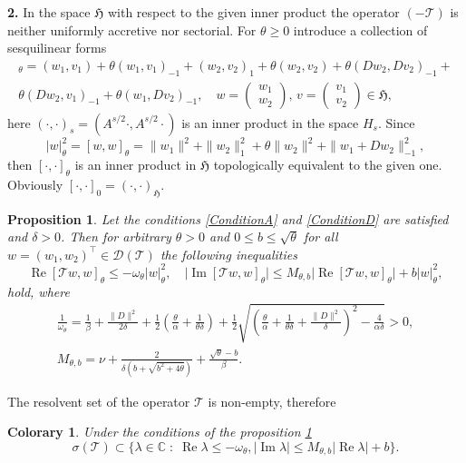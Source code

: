 \documentclass[12pt, reqno]{amsart}
\theoremstyle{plain}
\newtheorem{proposition}{Proposition}
\newtheorem{col}{Colorary}
\begin{document}
\textbf{2.} In the space ${{\mathfrak H}}$ with respect to the given inner product the operator $(-{{\mathcal{T} }})$ is neither uniformly accretive nor sectorial.
For $\theta\geq0$  introduce a collection of sesquilinear forms
 \begin{multline*}
 [w,v]_\theta=(w_1,v_1)+\theta(w_1,v_1)_{-1}+(w_2,v_2)_1+\theta (w_2,v_2)+\theta(Dw_2,Dv_2)_{-1}+\\
 \theta(Dw_2,v_1)_{-1}+\theta(w_1,Dv_2)_{-1},\quad w=\begin{pmatrix} w_1 \\ w_2 \end{pmatrix},\,
  v=\begin{pmatrix} v_1 \\ v_2 \end{pmatrix}\in{{\mathfrak H}},
 \end{multline*}
here $(\cdot,\cdot)_{s}=(A^{s/2}\cdot,A^{s/2}\cdot)$ is an inner product in the space $H_s$. 
Since
 \[
   |w|^2_\theta=[w,w]_\theta=\|w_1\|^2+\|w_2\|^2_1+\theta\|w_2\|^2+\|w_1+Dw_2\|^2_{-1},
 \]
then $[\cdot,\cdot]_\theta$ is an inner product in ${{\mathfrak H}}$ topologically equivalent to
the given one. Obviously $[\cdot,\cdot]_0=(\cdot,\cdot)_{{\mathfrak H}}$.
\begin{proposition}\label{QuaraticFormEstimate}
Let the conditions \ref{ConditionA} and \ref{ConditionD} are satisfied and $\delta>0$. 
Then for arbitrary $\theta>0$ and $0\leq b\leq\sqrt{\theta}$ for all 
$w=(w_1,w_2)^\top\in{{\mathcal D}}({{\mathcal{T} }})$ the following inequalities
 \[
    {\operatorname{Re}}[{{\mathcal{T} }} w,w]_\theta\leq -\omega_\theta|w|^2_\theta,\quad 
    \bigl|{\operatorname{Im}}[{{\mathcal{T} }} w,w]_\theta\bigr|\leq M_{\theta,b}\bigl|{\operatorname{Re}}[{{\mathcal{T} }} w,w]_\theta\bigr|+b|w|^2_\theta,
 \] 
hold, where
 \begin{gather*}
   \frac{1}{\omega_\theta} =\frac{1}{\beta}+\frac{\|D\|^2}{2\delta}+\frac12\left(\frac{\theta}{\alpha}+\frac{1}{\theta\delta}\right)+
   \frac12\sqrt{\left(\frac{\theta}{\alpha}+\frac{1}{\theta\delta}+\frac{\|D\|^2}{\delta}\right)^2-\frac{4}{\alpha\delta}}>0, \\
   M_{\theta,b} = \nu+\frac{2}{\delta(b+\sqrt{b^2+4\theta})}+\frac{\sqrt{\theta}-b}{\beta}.
 \end{gather*}
\end{proposition}
The resolvent set of the operator ${{\mathcal{T} }}$ is non-empty, therefore 
\begin{col}
Under the conditions of the proposition \ref{QuaraticFormEstimate}
 \[
    \sigma({{\mathcal{T} }})\subset\{\lambda\in{{\mathbb C}}\;:\; {\operatorname{Re}}\lambda\leq -\omega_\theta, 
     |{\operatorname{Im}}\lambda|\leq M_{\theta,b}|{\operatorname{Re}}\lambda|+b\}.
 \]
\end{col}
\end{document}

